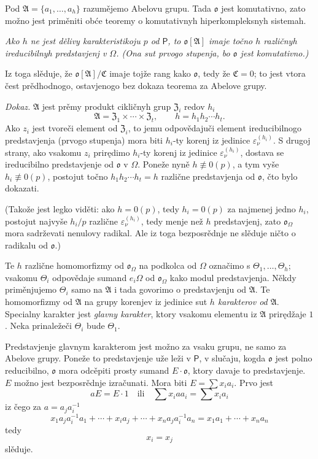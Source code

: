\documentclass[11pt]{article}
\begin{document}
Pod \(\mathfrak A=\{a_1,\ldots,a_h\}\) razumějemo Abelovu grupu. Tada \(\mathfrak o\) jest komutativno, zato možno jest priměniti obće teoremy o komutativnyh hiperkompleksnyh sistemah.

\emph{Ako \(h\) ne jest dělivy karakteristikoju \(p\) od \(\mathsf P\), to \(\mathfrak o[\mathfrak A]\) imaje točno \(h\) različnyh ireducibilnyh predstavjenj v \(\Omega\). (Ona sut prvogo stupenja, bo \(\mathfrak o\) jest komutativno.)}

Iz toga slěduje, že \(\mathfrak o[\mathfrak A]/\mathfrak C\) imaje tojže rang kako \(\mathfrak o\), tedy že \(\mathfrak C=0\); to jest vtora čest prědhodnogo, ostavjenogo bez dokaza teorema za Abelove grupy.

\emph{Dokaz.} \(\mathfrak A\) jest prěmy produkt cikličnyh grup \(\mathfrak Z_i\) redov \(h_i\)
\[
\mathfrak A=\mathfrak Z_1\times\cdots\times\mathfrak Z_t,\qquad
h=h_1h_2\cdots h_t .
\]
Ako \(z_i\) jest tvoreči element od \(\mathfrak Z_i\), to jemu odpovědajuči element ireducibilnogo predstavjenja (prvogo stupenja) mora biti \(h_i\)-ty korenj iz jedinice \(\varepsilon_\nu^{(h_i)}\). S drugoj strany, ako vsakomu \(z_i\) prirędimo \(h_i\)-ty korenj iz jedinice \(\varepsilon_\nu^{(h_i)}\), dostava se ireducibilno predstavjenje od \(\mathfrak o\) v \(\Omega\). Poneže nyně \(h\not\equiv0(p)\), a tym vyše \(h_i\not\equiv0(p)\), postojut točno \(h_1h_2\cdots h_t=h\) različne predstavjenja od \(\mathfrak o\), čto bylo dokazati.

(Takože jest legko viděti: ako \(h=0(p)\), tedy \(h_i=0(p)\) za najmenej jedno \(h_i\), postojut najvyše \(h_i/p\) različne \(\varepsilon_\nu^{(h_i)}\), tedy menje než \(h\) predstavjenj, zato \(\mathfrak o_\Omega\) mora sadrževati nenulovy radikal. Ale iz toga bezposrědnje ne slěduje ničto o radikalu od \(\mathfrak o\).)

Te \(h\) različne homomorfizmy od \(\mathfrak o_\Omega\) na podkolca od \(\Omega\) označimo s \(\Theta_1,\ldots,\Theta_h\); vsakomu \(\Theta_i\) odpovědaje sumand \(e_i\Omega\) od \(\mathfrak o_\Omega\) kako modul predstavjenja. Někdy priměnjujemo \(\Theta_i\) samo na \(\mathfrak A\) i tada govorimo o predstavjenju od \(\mathfrak A\). Te homomorfizmy od \(\mathfrak A\) na grupy korenjev iz jedinice sut \emph{\(h\) karakterov od \(\mathfrak A\)}. Specialny karakter jest \emph{glavny karakter}, ktory vsakomu elementu iz \(\mathfrak A\) prirędžaje \(1\). Neka prinaležeči \(\Theta_i\) bude \(\Theta_1\).

Predstavjenje glavnym karakterom jest možno za vsaku grupu, ne samo za Abelove grupy. Poneže to predstavjenje uže leži v \(\mathsf P\), v slučaju, kogda \(\mathfrak o\) jest polno reducibilno, \(\mathfrak o\) mora odcěpiti prosty sumand \(E\cdot\mathfrak o\), ktory davaje to predstavjenje. \(E\) možno jest bezposrědnje izračunati. Mora biti \(E=\sum x_i a_i\). Prvo jest
\[
aE=E\cdot 1\quad\text{ili}\quad \sum x_i a a_i=\sum x_i a_i
\]
iz čego za \(a=a_j a_i^{-1}\)
\[
x_1a_ja_i^{-1}a_1+\cdots+x_i a_j+\cdots+x_na_ja_i^{-1}a_n
=x_1a_1+\cdots+x_na_n
\]
tedy
\[
x_i=x_j
\]
slěduje.
\end{document}

